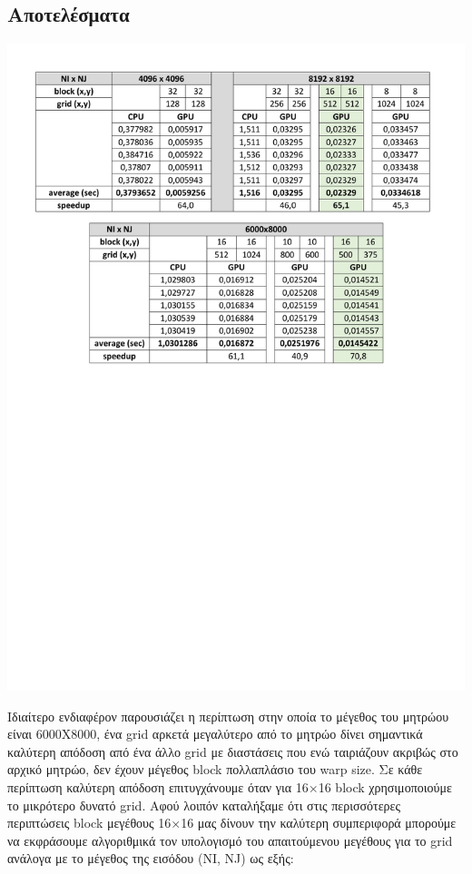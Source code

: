 \vspace{-0.3cm}
\subsection*{Αποτελέσματα}

\begin{center}
    \includegraphics[scale=0.8]{./figures/1_conv/table1}
\end{center}

Ιδιαίτερο ενδιαφέρον παρουσιάζει η περίπτωση στην οποία το μέγεθος του μητρώου είναι 6000Χ8000, ένα grid αρκετά μεγαλύτερο από το μητρώο δίνει σημαντικά καλύτερη απόδοση από ένα άλλο grid με διαστάσεις που ενώ  ταιριάζουν ακριβώς στο αρχικό μητρώο, δεν έχουν μέγεθος block πολλαπλάσιο του warp size. Σε κάθε περίπτωση καλύτερη απόδοση επιτυγχάνουμε όταν για 16×16 block χρησιμοποιούμε το μικρότερο δυνατό grid. Αφού λοιπόν καταλήξαμε ότι στις περισσότερες περιπτώσεις block μεγέθους 16×16 μας δίνουν την καλύτερη συμπεριφορά μπορούμε να εκφράσουμε αλγοριθμικά τον υπολογισμό του απαιτούμενου μεγέθους για το grid ανάλογα με το μέγεθος της εισόδου (NI, NJ) ως εξής:

